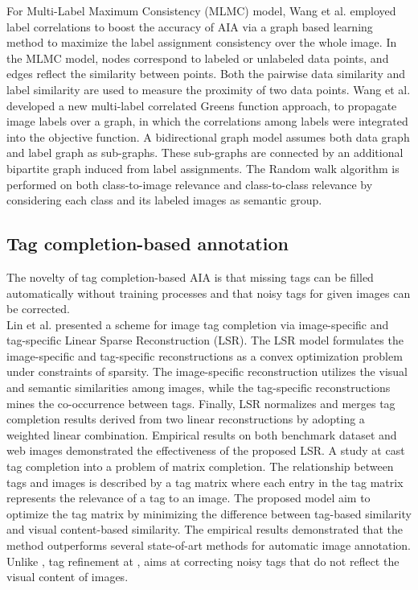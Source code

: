 \documentclass[conference]{IEEEtran}
\begin{document}
		For Multi-Label Maximum Consistency (MLMC) model, Wang et al.\cite{MLMC} employed
 label correlations to boost the accuracy of AIA via a graph based learning method to
maximize the label assignment consistency over the whole image. In the MLMC model,
nodes correspond to labeled or unlabeled data points, and edges reflect the similarity
between points. Both the pairwise data similarity and label similarity are used to measure
the proximity of two data points. Wang et al.\cite{Wang} developed a new multi-label correlated
Greens function approach, to propagate image labels over a graph, in which the correlations
among labels were integrated into the objective function. A bidirectional graph model
assumes both data graph and label graph as sub-graphs. These sub-graphs are connected by
an additional bipartite graph induced from label assignments. The Random walk algorithm
is performed on both class-to-image relevance and class-to-class relevance by considering
each class and its labeled images as semantic group.


	\subsection{Tag completion-based annotation}

		The novelty of tag completion-based AIA is that missing tags can be filled automatically
without training processes and that noisy tags for given images can be corrected.\\
		
		Lin et al.\cite{LSR} presented a scheme for image tag completion via image-specific and tag-specific Linear Sparse Reconstruction (LSR). The LSR model formulates the image-specific
and tag-specific reconstructions as a convex optimization problem under constraints of
sparsity. The image-specific reconstruction utilizes the visual and semantic similarities
among images, while the tag-specific reconstructions mines the co-occurrence between
tags. Finally, LSR normalizes and merges tag completion results derived from two linear
reconstructions by adopting a weighted linear combination. Empirical results on both
benchmark dataset and web images demonstrated the effectiveness of the proposed LSR.
A study at\cite{TCFIR} cast tag completion into a problem of matrix completion. The
relationship between tags and images is described by a tag matrix where each entry in
the tag matrix represents the relevance of a tag to an image. The proposed model aim to
optimize the tag matrix by minimizing the difference between tag-based similarity and visual
content-based similarity. The empirical results demonstrated that the method outperforms
		several state-of-art methods for automatic image annotation. Unlike \cite{TCFIR}, tag refinement at \cite{ITCR}, aims at correcting noisy tags that do not reflect the visual content of images.
\end{document}

